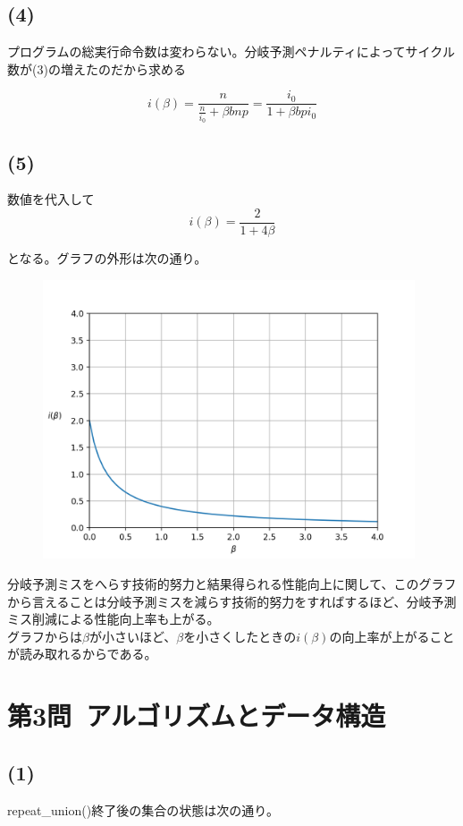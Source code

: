 \documentclass[a4paper,12pt,xelatex,ja=standard]{bxjsarticle}
\begin{document}
\subsection*{(4)}
プログラムの総実行命令数は変わらない。分岐予測ペナルティによってサイクル数が(3)の増えたのだから求める

\[
  i(\beta) = \frac{n}{\frac{n}{i_0} + \beta bnp} = \frac{i_0}{1 + \beta b p i_0}
\]

\subsection*{(5)}
数値を代入して
\[
  i(\beta) = \frac{2}{1 + 4 \beta}
\]

となる。グラフの外形は次の通り。

\begin{figure}[H]
  \centering
  \includegraphics[width=11cm]{images/2010_2.png}
\end{figure}

分岐予測ミスをへらす技術的努力と結果得られる性能向上に関して、このグラフから言えることは分岐予測ミスを減らす技術的努力をすればするほど、分岐予測ミス削減による性能向上率も上がる。\\
グラフからは$\beta$が小さいほど、$\beta$を小さくしたときの$i(\beta)$の向上率が上がることが読み取れるからである。

\section*{第3問\ アルゴリズムとデータ構造}
\subsection*{(1)}
repeat\_union()終了後の集合の状態は次の通り。
\end{document}
